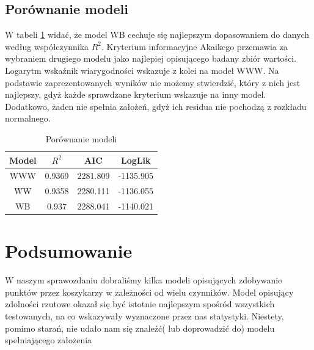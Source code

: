 \documentclass[11pt,a4paper]{article}
\begin{document}
\subsection{Porównanie modeli}
W tabeli \ref{porownanie_modeli_w} widać, że model WB cechuje się najlepszym dopasowaniem do danych według współczynnika $R^2$. Kryterium informacyjne Akaikego przemawia za wybraniem drugiego modelu jako najlepiej opisującego badany zbiór wartości. Logarytm wskaźnik wiarygodności wskazuje z kolei na model WWW. Na podstawie zaprezentowanych wyników nie możemy stwierdzić, który z nich jest najlepszy, gdyż każde sprawdzane kryterium wskazuje na inny model. Dodatkowo, żaden nie spełnia założeń, gdyż ich residua nie pochodzą z rozkładu normalnego.
\begin{table}
	\begin{center}
		\begin{tabular}{| c | c | c | c |}
			\hline
			Model & $R^2$ & AIC & LogLik\\ \hline
			WWW &0.9369  & 2281.809 & -1135.905\\ \hline
			WW & 0.9358  & 2280.111 & -1136.055 \\ \hline 
			WB & 0.937 & 2288.041 & -1140.021 \\ \hline  
		\end{tabular}
		\caption{Porównanie modeli}
		\label{porownanie_modeli_w}
	\end{center}
\end{table}

\section{Podsumowanie}
W naszym sprawozdaniu dobraliśmy kilka modeli opisujących zdobywanie punktów przez koszykarzy w zależności od wielu czynników. Model opisujący zdolności rzutowe okazał się być istotnie najlepszym spośród wszystkich testowanych, na co wskazywały wyznaczone przez nas statystyki. Niestety, pomimo starań, nie udało nam się znaleźć( lub doprowadzić do) modelu spełniającego założenia 
\end{document}
